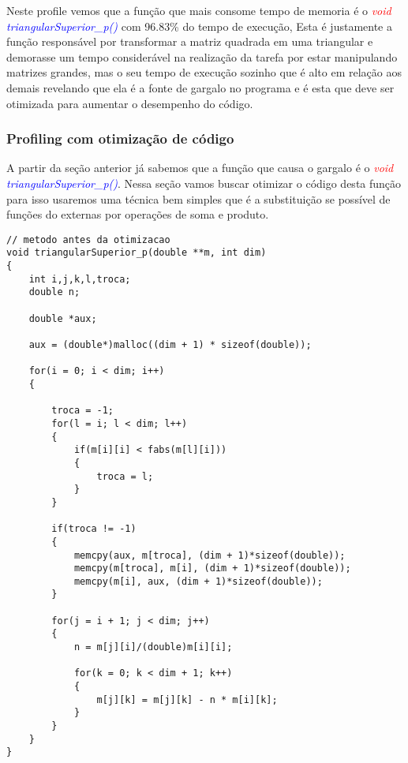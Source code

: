 \documentclass[]{article}
\begin{document}
Neste profile vemos que a função que mais consome tempo de memoria é o \textit{\textcolor{red}{void} \textcolor{blue}{triangularSuperior\_p()}} com 96.83\% do tempo de execução, Esta é justamente a função responsável por transformar a matriz quadrada em uma triangular e demorasse um tempo considerável na realização da tarefa por estar manipulando matrizes grandes, mas o seu tempo de execução sozinho que é alto em relação aos demais revelando que ela é a fonte de gargalo no programa e é esta que deve ser otimizada para aumentar o desempenho do código. 

\subsubsection{Profiling com otimização de código}

A partir da seção anterior já sabemos que a função que causa o gargalo é o \textit{\textcolor{red}{void} \textcolor{blue}{triangularSuperior\_p()}}. Nessa seção vamos buscar otimizar o código desta função para isso usaremos uma técnica bem simples que é a substituição se possível de funções do externas por operações de soma e produto.

\begin{lstlisting}
// metodo antes da otimizacao
void triangularSuperior_p(double **m, int dim)
{
	int i,j,k,l,troca;
	double n;

	double *aux;

	aux = (double*)malloc((dim + 1) * sizeof(double));

	for(i = 0; i < dim; i++)
	{

		troca = -1;
		for(l = i; l < dim; l++)
		{
			if(m[i][i] < fabs(m[l][i]))
			{
				troca = l;
			}
		}

		if(troca != -1)
		{
			memcpy(aux, m[troca], (dim + 1)*sizeof(double));
			memcpy(m[troca], m[i], (dim + 1)*sizeof(double));
			memcpy(m[i], aux, (dim + 1)*sizeof(double));
		}

		for(j = i + 1; j < dim; j++)
		{
			n = m[j][i]/(double)m[i][i];

			for(k = 0; k < dim + 1; k++)
			{
				m[j][k] = m[j][k] - n * m[i][k];
			}
		}
	}
}
\end{lstlisting}
\end{document}
